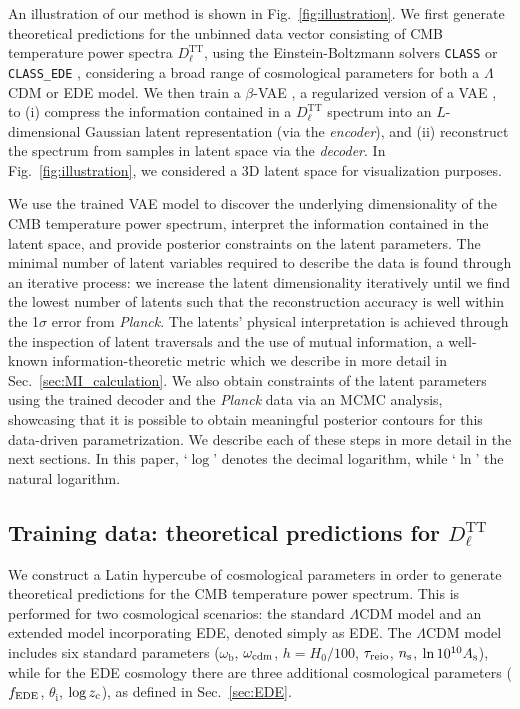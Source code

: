 \documentclass[aps, prd, reprint, superscriptaddress, nofootinbib, bibnotes]{revtex4-2}
\newcommand{\Planck}{\textit{Planck}}
\newcommand{\Dl}{$D_{\ell}^\mathrm{TT}$}
\begin{document}
An illustration of our method is shown in Fig.~\ref{fig:illustration}. We first generate theoretical predictions for the unbinned data vector consisting of CMB temperature power spectra $D_{\ell}^{\mathrm{TT}}$, using the Einstein-Boltzmann solvers \texttt{CLASS} \citep{Lesgourgues2011, Blas2011} or \texttt{CLASS\_EDE} \cite{Hill:2020osr}, considering a broad range of cosmological parameters for both a $\Lambda$CDM or EDE model. We then train a $\beta$-VAE \cite{Higgins17}, a regularized version of a VAE \cite{KingmaWelling2013, Rezende2014}, to (i) compress the information contained in a $D_{\ell}^{\mathrm{TT}}$ spectrum into an $L$-dimensional Gaussian latent representation (via the \textit{encoder}), and (ii) reconstruct the spectrum from samples in latent space via the \textit{decoder}. In Fig.~\ref{fig:illustration}, we considered a 3D latent space for visualization purposes. 

We use the trained VAE model to discover the underlying dimensionality of the CMB temperature power spectrum, interpret the information contained in the latent space, and provide posterior constraints on the latent parameters. The minimal number of latent variables required to describe the data is found through an iterative process: we increase the latent dimensionality iteratively until we find the lowest number of latents such that the reconstruction accuracy is well within the 1$\sigma$ error from \Planck{}. The latents' physical interpretation is achieved through the inspection of latent traversals and the use of mutual information, a well-known information-theoretic metric which we describe in more detail in Sec.~\ref{sec:MI_calculation}. We also obtain constraints of the latent parameters using the trained decoder and the \Planck{} data via an MCMC analysis, showcasing that it is possible to obtain meaningful posterior contours for this data-driven parametrization. We describe each of these steps in more detail in the next sections. In this paper, `$\log$' denotes the decimal logarithm, while `$\ln$' the natural logarithm.


\subsection{Training data: theoretical predictions for \Dl} \label{sec:DlTT_class}
We construct a Latin hypercube of cosmological parameters in order to generate theoretical predictions for the CMB temperature power spectrum. 
This is performed for two cosmological scenarios: the standard $\Lambda$CDM model and an extended model incorporating EDE, denoted simply as EDE.
The $\Lambda$CDM model includes six standard parameters ($\omega_{\mathrm{b}}$, $\omega_{\rm cdm}$, $h=H_0/100$, $\tau_{\rm reio}$, $n_{\rm s}$, $\ln 10^{10} A_{\rm s}$), while for the EDE cosmology there are three additional cosmological parameters ($f_{\rm EDE}$, $\theta_\mathrm{i}$, $\log z_{\rm c}$), as defined in Sec.~\ref{sec:EDE}.
\end{document}
